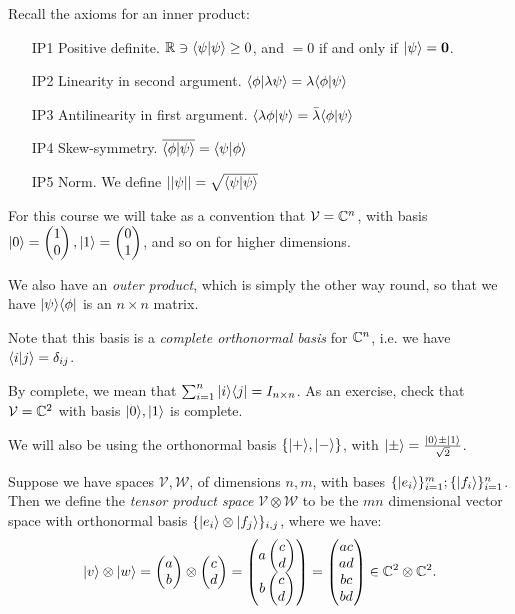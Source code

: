 \documentclass[10pt,a4paper]{article}
\begin{document}
Recall the axioms for an inner product:
\begin{itemize}
\item[IP1] Positive definite. $\mathbb{R} \ni \langle \psi | \psi \rangle \geq 0$, and $=0$ if and only if $|\psi\rangle = \mathbf{0}$.
\item[IP2] Linearity in second argument. $\langle \phi | \lambda\psi \rangle = \lambda \langle \phi | \psi \rangle$
\item[IP3] Antilinearity in first argument. $\langle \lambda\phi | \psi \rangle = \bar{\lambda}\langle \phi | \psi \rangle$
\item[IP4] Skew-symmetry. $\overline{\langle \phi | \psi \rangle} = \langle \psi | \phi \rangle$
\item[IP5] Norm. We define $||\psi|| = \sqrt{\langle \psi | \psi \rangle}$
\end{itemize}

For this course we will take as a convention that $\mathcal{V} = \mathbb{C}^n$, with basis $|0\rangle = \begin{pmatrix} 1 \\ 0 \end{pmatrix}, |1\rangle = \begin{pmatrix}
0 \\ 1 \end{pmatrix}$, and so on for higher dimensions.

We also have an \emph{outer product}, which is simply the other way round, so that we have $|\psi\rangle\langle \phi|$ is an $n\times n$ matrix.

Note that this basis is a \emph{complete orthonormal basis} for $\mathbb{C}^n$, i.e. we have $\langle i | j \rangle = \delta_{ij}$.

By complete, we mean that $\sum_{i=1}^n |i\rangle\langle j| = I_{n \times n}$. As an exercise, check that $\mathcal{V} = \mathbb{C}^2$ with basis $|0\rangle, |1\rangle$ is complete.

We will also be using the orthonormal basis $\{|+\rangle, |-\rangle\}$, with $|\pm\rangle = \frac{|0\rangle\pm|1\rangle}{\sqrt{2}}$.

Suppose we have spaces $\mathcal{V}, \mathcal{W}$, of dimensions $n, m$, with bases $\{|e_i\rangle\}_{i=1}^m; \{|f_i\rangle\}_{i=1}^n$. Then we define the \emph{tensor product space} $\mathcal{V} \otimes \mathcal{W}$ to be the $mn$ dimensional vector space with orthonormal basis $\{|e_i\rangle\otimes|f_j\rangle\}_{i,j}$, where we have:
\begin{align*}
|v\rangle\otimes|w\rangle = \begin{pmatrix} a \\ b \end{pmatrix} \otimes \begin{pmatrix} c \\ d \end{pmatrix} = \begin{pmatrix} a \begin{pmatrix} c \\ d \end{pmatrix}\\b \begin{pmatrix} c\\d \end{pmatrix} \end{pmatrix} = \begin{pmatrix} ac \\ ad\\ bc \\ bd \end{pmatrix} \in \mathbb{C}^2\otimes \mathbb{C}^2.
\end{align*}
\end{document}
